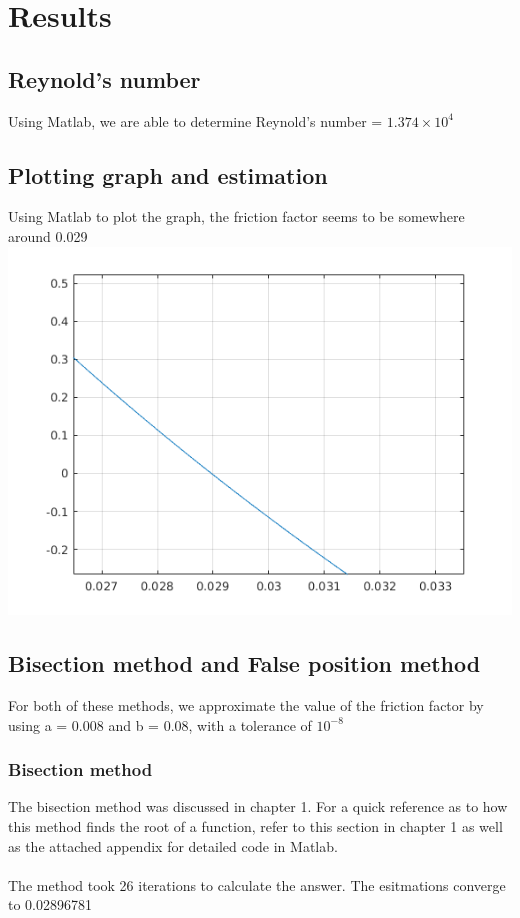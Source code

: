 \documentclass{book}
\begin{document}
	\section{Results}
	\subsection{Reynold's number}
    Using Matlab, we are able to determine Reynold's number = ${1.374 \times 10^4}$
    
    \subsection{Plotting graph and estimation}
    Using Matlab to plot the graph, the friction factor seems to be somewhere around 0.029 \\
    \includegraphics[scale=0.6]{untitled.png}
    
    \subsection{Bisection method and False position method}
    For both of these methods, we approximate the value of the friction factor by using a = 0.008 and b = 0.08, with a tolerance of ${10^{-8}}$
    \subsubsection{Bisection method}
    The bisection method was discussed in chapter 1. For a quick reference as to how this method finds the root of a function, refer to this section in chapter 1 as well as the attached appendix for detailed code in Matlab.\\
    \\
    The method took 26 iterations to calculate the answer. The esitmations converge to 0.02896781 
\end{document}
